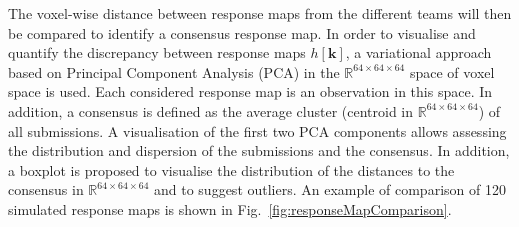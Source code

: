 \documentclass[fleqn,a4paper,oneside,openany]{book}
\begin{document}
The voxel-wise distance between response maps from the different teams will then be compared to identify a consensus response map. In order to visualise and quantify the discrepancy between response maps $h[\boldsymbol{k}]$, a variational approach based on Principal Component Analysis (PCA) in the $\mathbb{R}^{64\times64\times64}$ space of voxel space is used. Each considered response map is an observation in this space.
In addition, a consensus is defined as the average cluster (centroid in $\mathbb{R}^{64\times64\times64}$) of all submissions.
A visualisation of the first two PCA components allows assessing the distribution and dispersion of the submissions and the consensus. 
In addition, a boxplot is proposed to visualise the distribution of the  distances to the consensus in $\mathbb{R}^{64\times64\times64}$ and to suggest outliers.
An example of comparison of 120 simulated response maps is shown in Fig.~\ref{fig:responseMapComparison}.
\end{document}
